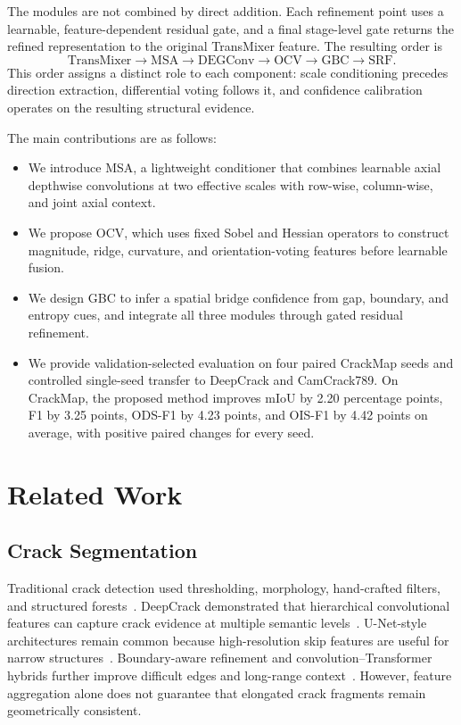 \documentclass[preprint,12pt]{elsarticle}
\begin{document}
The modules are not combined by direct addition. Each refinement point uses a learnable, feature-dependent residual gate, and a final stage-level gate returns the refined representation to the original TransMixer feature. The resulting order is
\begin{equation}
\text{TransMixer} \rightarrow \text{MSA} \rightarrow \text{DEGConv}
\rightarrow \text{OCV} \rightarrow \text{GBC} \rightarrow \text{SRF}.
\end{equation}
This order assigns a distinct role to each component: scale conditioning precedes direction extraction, differential voting follows it, and confidence calibration operates on the resulting structural evidence.

The main contributions are as follows:
\begin{itemize}
    \item We introduce MSA, a lightweight conditioner that combines learnable axial depthwise convolutions at two effective scales with row-wise, column-wise, and joint axial context.
    \item We propose OCV, which uses fixed Sobel and Hessian operators to construct magnitude, ridge, curvature, and orientation-voting features before learnable fusion.
    \item We design GBC to infer a spatial bridge confidence from gap, boundary, and entropy cues, and integrate all three modules through gated residual refinement.
    \item We provide validation-selected evaluation on four paired CrackMap seeds and controlled single-seed transfer to DeepCrack and CamCrack789. On CrackMap, the proposed method improves mIoU by 2.20 percentage points, F1 by 3.25 points, ODS-F1 by 4.23 points, and OIS-F1 by 4.42 points on average, with positive paired changes for every seed.
\end{itemize}

\section{Related Work}
\label{sec:related_work}

\subsection{Crack Segmentation}

Traditional crack detection used thresholding, morphology, hand-crafted filters, and structured forests~\cite{shi2016crackforest}. DeepCrack demonstrated that hierarchical convolutional features can capture crack evidence at multiple semantic levels~\cite{zou2019deepcrack}. U-Net-style architectures remain common because high-resolution skip features are useful for narrow structures~\cite{ronneberger2015unet}. Boundary-aware refinement and convolution--Transformer hybrids further improve difficult edges and long-range context~\cite{guo2021barnet,xiang2023dtrcnet}. However, feature aggregation alone does not guarantee that elongated crack fragments remain geometrically consistent.
\end{document}
